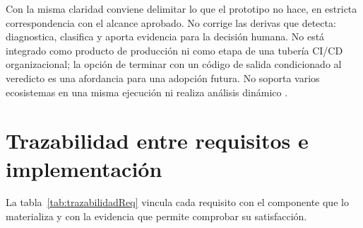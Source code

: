 Con la misma claridad conviene delimitar lo que el prototipo no hace, en estricta correspondencia con el alcance aprobado. No corrige las derivas que detecta: diagnostica, clasifica y aporta evidencia para la decisión humana. No está integrado como producto de producción ni como etapa de una tubería CI/CD organizacional; la opción de terminar con un código de salida condicionado al veredicto es una afordancia para una adopción futura. No soporta varios ecosistemas en una misma ejecución ni realiza análisis dinámico \citep{LAIG2025}.

\section{Trazabilidad entre requisitos e implementación}
La tabla~\ref{tab:trazabilidadReq} vincula cada requisito con el componente que lo materializa y con la evidencia que permite comprobar su satisfacción.

